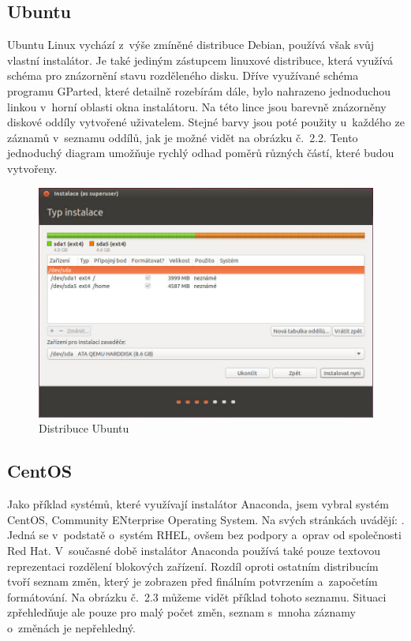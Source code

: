\documentclass[printed,color,table,oneside,nolot,nolof]{fithesis}
\begin{document}
\subsection{Ubuntu}

	Ubuntu Linux\cite{ubuntu} vychází z~výše zmíněné distribuce Debian, používá však svůj vlastní instalátor. Je také jediným zástupcem linuxové distribuce, která využívá  schéma 
	pro znázornění stavu rozděleného disku. Dříve využívané schéma programu GParted, které detailně rozebírám dále, bylo nahrazeno jednoduchou linkou v~horní oblasti okna instalátoru. Na této lince 
	jsou barevně znázorněny diskové 
	oddíly vytvořené uživatelem. Stejné barvy jsou poté použity u~každého ze záznamů v~seznamu oddílů, jak je možné vidět na obrázku č.~2.2. Tento jednoduchý diagram umožňuje rychlý odhad poměrů různých 
	částí, které budou vytvořeny.

\begin{figure}[h!]
	\label{fig:ubuntu}
	\caption{Distribuce Ubuntu}
	\centering
	\includegraphics[width=.8\columnwidth]{pictures/ubuntu1.jpg}
\end{figure}

\subsection{CentOS}

	Jako příklad systémů, které využívají instalátor Anaconda, jsem vybral systém CentOS, Community ENterprise Operating System. Na svých stránkách uvádějí: \cite{centos}. Jedná se v~podstatě o~systém 
	RHEL, ovšem bez podpory a~oprav od společnosti Red Hat. V~současné době instalátor Anaconda používá také pouze textovou reprezentaci rozdělení blokových zařízení. 
	Rozdíl oproti ostatním distribucím tvoří 
	seznam změn, který je zobrazen před finálním potvrzením a~započetím formátování. Na obrázku č.~2.3 můžeme vidět příklad tohoto seznamu. Situaci zpřehledňuje ale pouze pro malý počet změn, seznam s~mnoha 
	záznamy o~změnách je nepřehledný. 
\end{document}
